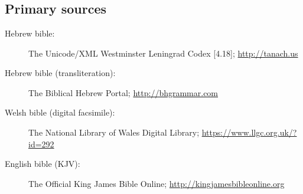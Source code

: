 \nocite{avrahami.y:2012:senses}
\nocite{levy.j:1967:translation}
\nocite{even-shoshan.a:1977:concordance}

\section{\bibname}

\printbibliography[heading=none]

\subsection{Primary sources}

\begin{description}
	\item [Hebrew bible:] The Unicode/XML Westminster Leningrad Codex [4.18]; \url{http://tanach.us}
	\item [Hebrew bible (transliteration):] The Biblical Hebrew Portal; \url{http://bhgrammar.com}
	\item [Welsh bible (digital facsimile):] The National Library of Wales Digital Library; \url{https://www.llgc.org.uk/?id=292}
	\item [English bible (KJV):] The Official King James Bible Online; \url{http://kingjamesbibleonline.org}
\end{description}



